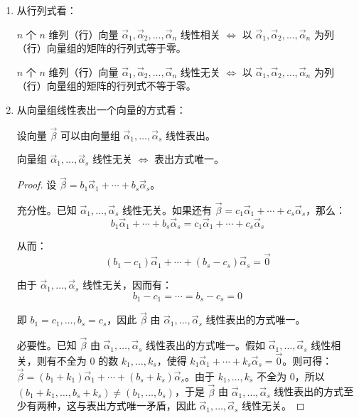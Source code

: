 \begin{enumerate}
	\item 从行列式看：

	$n$ 个 $n$ 维列（行）向量 $\vec \alpha_1, \vec \alpha_2, \ldots, \vec \alpha_n$ 线性相关 $\Longleftrightarrow$ 以 $\vec \alpha_1, \vec \alpha_2, \ldots, \vec \alpha_n$ 为列（行）向量组的矩阵的行列式等于零。

	$n$ 个 $n$ 维列（行）向量 $\vec \alpha_1, \vec \alpha_2, \ldots, \vec \alpha_n$ 线性无关 $\Longleftrightarrow$ 以 $\vec \alpha_1, \vec \alpha_2, \ldots, \vec \alpha_n$ 为列（行）向量组的矩阵的行列式不等于零。

	\item 从向量组线性表出一个向量的方式看：

	设向量 $\vec \beta$ 可以由向量组 $\vec \alpha_1, \ldots, \vec \alpha_s$ 线性表出。

	向量组 $\vec \alpha_1, \ldots, \vec \alpha_s$ 线性无关 $\Longleftrightarrow$ 表出方式唯一。

	\begin{proof}
		设 $\vec \beta = b_1 \vec \alpha_1 + \cdots + b_s \vec \alpha_s$。

		\bigskip

		充分性。已知 $\vec \alpha_1, \ldots, \vec \alpha_s$ 线性无关。如果还有 $\vec \beta = c_1 \vec \alpha_1 + \cdots + c_s \vec \alpha_s$，那么：
		$$
		b_1 \vec \alpha_1 + \cdots + b_s \vec \alpha_s = c_1 \vec \alpha_1 + \cdots + c_s \vec \alpha_s
		$$

		从而：
		$$
		(b_1 - c_1) \vec \alpha_1 + \cdots + (b_s - c_s) \vec \alpha_s = \vec 0
		$$

		由于 $\vec \alpha_1, \ldots, \vec \alpha_s$ 线性无关，因而有：
		$$
		b_1 - c_1 = \cdots = b_s - c_s = 0
		$$

		即 $b_1 = c_1, \ldots, b_s = c_s$，因此 $\vec \beta$ 由 $\vec \alpha_1, \ldots, \vec \alpha_s$ 线性表出的方式唯一。

		\bigskip

		必要性。已知 $\vec \beta$ 由 $\vec \alpha_1, \ldots, \vec \alpha_s$ 线性表出的方式唯一。假如 $\vec \alpha_1, \ldots, \vec \alpha_s$ 线性相关，则有不全为 $0$ 的数 $k_1, \ldots, k_s$，使得 $k_1 \vec \alpha_1 + \cdots + k_s \vec \alpha_s = \vec 0$。则可得：$\vec \beta = (b_1 + k_1) \vec \alpha_1 + \cdots + (b_s + k_s) \vec \alpha_s$。由于 $k_1, \ldots, k_s$ 不全为 $0$，所以 $(b_1 + k_1, \ldots, b_s + k_s) \ne (b_1, \ldots, b_s)$，于是 $\vec \beta$ 由 $\vec \alpha_1, \ldots, \vec \alpha_s$ 线性表出的方式至少有两种，这与表出方式唯一矛盾，因此 $\vec \alpha_1, \ldots, \vec \alpha_s$ 线性无关。
	\end{proof}


\end{enumerate}
